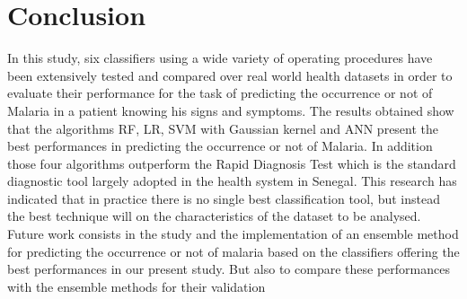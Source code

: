 \section{Conclusion}\label{conclusion}
In this study, six classifiers using a wide variety of operating procedures have been extensively tested and compared over real world health datasets in order to evaluate their performance for the task of predicting the occurrence or not of Malaria in a patient knowing his signs and symptoms. The results obtained show that the algorithms RF, LR,
SVM with Gaussian kernel and ANN present the best performances in predicting the occurrence or not of Malaria. In addition those four algorithms outperform the Rapid Diagnosis Test which is the standard diagnostic tool largely adopted in the health system in
Senegal. This research has indicated that in practice there is no single best classification tool, but instead the best technique will on the characteristics of the dataset to be analysed. 
Future work consists in the study and the implementation of an ensemble method for predicting the occurrence or not of malaria based on the classifiers offering the best performances in our present study. But also to compare these performances with the ensemble methods for their validation
